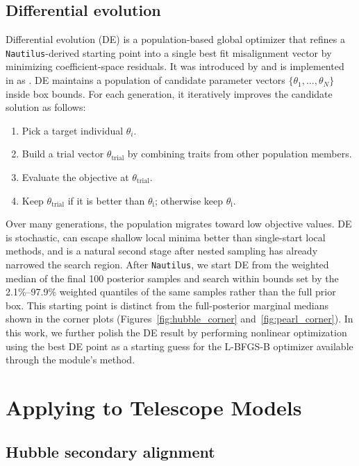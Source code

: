 \documentclass[fleqn,usenatbib]{rasti}
\begin{document}
\subsection{Differential evolution}
Differential evolution (DE) is a population-based global optimizer that refines a \texttt{Nautilus}-derived starting point into a single best fit misalignment vector by minimizing coefficient-space residuals. It was introduced by \citet{StornPrice1997} and is implemented in   as .
DE maintains a population of candidate parameter vectors $\{\theta_1, \dots, \theta_N\}$ inside box bounds. For each generation, it iteratively improves the candidate solution as follows:
\begin{enumerate}
    \item Pick a target individual $\theta_i$.
    \item Build a trial vector $\theta_{\mathrm{trial}}$ by combining traits from other population members.
    \item Evaluate the objective at $\theta_{\mathrm{trial}}$.
    \item Keep $\theta_{\mathrm{trial}}$ if it is better than $\theta_\mathrm{i}$; otherwise keep $\theta_\mathrm{i}$.
\end{enumerate}
Over many generations, the population migrates toward low objective values. DE is stochastic, can escape shallow local minima better than single-start local methods, and is a natural second stage after nested sampling has already narrowed the search region. After \texttt{Nautilus}, we start DE from the weighted median of the final 100 posterior samples and search within bounds set by the 2.1\%--97.9\% weighted quantiles of the same samples rather than the full prior box. This starting point is distinct from the full-posterior marginal medians shown in the corner plots (Figures~\ref{fig:hubble_corner} and~\ref{fig:pearl_corner}). In this work, we further polish the DE result by performing nonlinear optimization using the best DE point as a starting guess for the L-BFGS-B optimizer available through the  module's  method. 

\section{Applying to Telescope Models}
\subsection{Hubble secondary alignment}\label{sec:hubble}
\end{document}
